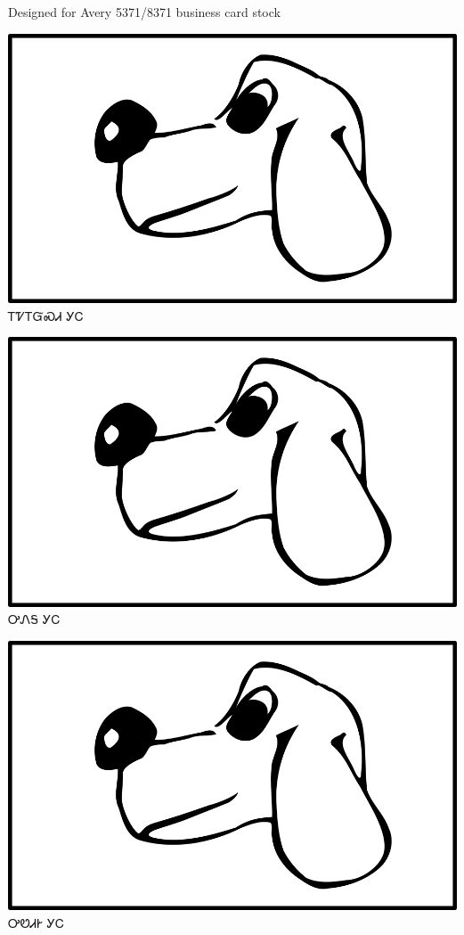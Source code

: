 \documentclass[avery5371]{flashcards}%
\begin{document}
    Designed for Avery 5371/8371 business card stock

    \begin{flashcard}{
        \includegraphics[width=0.95\columnwidth,height=.51\columnwidth,keepaspectratio]{../artwork/for-colors/gihli}
    }
        \Huge ᎢᏤᎢᏳᏍᏗ ᎩᏟ
    \end{flashcard}

    \begin{flashcard}{
        \includegraphics[width=0.95\columnwidth,height=.51\columnwidth,keepaspectratio]{../artwork/for-colors/gihli}
    }
        \Huge ᎤᏁᎦ ᎩᏟ
    \end{flashcard}

    \begin{flashcard}{
        \includegraphics[width=0.95\columnwidth,height=.51\columnwidth,keepaspectratio]{../artwork/for-colors/gihli}
    }
        \Huge ᎤᏬᏗᎨ ᎩᏟ
    \end{flashcard}
\end{document}
